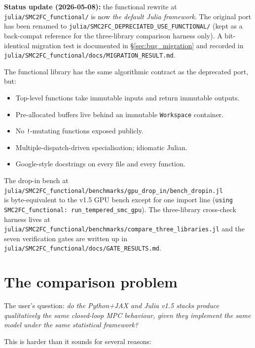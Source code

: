 \documentclass[11pt,a4paper]{article}
\begin{document}
\textbf{Status update (2026-05-08):} the functional rewrite at
\texttt{julia/SMC2FC\_functional/} is now \emph{the default Julia
framework}. The original port has been renamed to
\texttt{julia/SMC2FC\_DEPRECIATED\_USE\_FUNCTIONAL/} (kept as a
back-compat reference for the three-library comparison harness only).
A bit-identical migration test is documented in
\S\ref{sec:bug_migration} and recorded in
\texttt{julia/SMC2FC\_functional/docs/MIGRATION\_RESULT.md}.

The functional library has the same algorithmic contract as the
deprecated port, but:

\begin{itemize}[itemsep=2pt]
  \item Top-level functions take immutable inputs and return
        immutable outputs.
  \item Pre-allocated buffers live behind an immutable
        \texttt{Workspace} container.
  \item No \texttt{!}-mutating functions exposed publicly.
  \item Multiple-dispatch-driven specialisation; idiomatic Julian.
  \item Google-style docstrings on every file and every function.
\end{itemize}

The drop-in bench at\\
\texttt{julia/SMC2FC\_functional/benchmarks/gpu\_drop\_in/bench\_dropin.jl}\\
is byte-equivalent to the v1.5 GPU bench except for one import line
(\texttt{using SMC2FC\_functional: run\_tempered\_smc\_gpu}). The
three-library cross-check harness lives at\\
\texttt{julia/SMC2FC\_functional/benchmarks/compare\_three\_libraries.jl}
and the seven verification gates are written up in
\texttt{julia/SMC2FC\_functional/docs/GATE\_RESULTS.md}.

\section{The comparison problem}

The user's question: \emph{do the Python+JAX and Julia v1.5 stacks
produce qualitatively the same closed-loop MPC behaviour, given
they implement the same model under the same statistical
framework?}

This is harder than it sounds for several reasons:
\end{document}
